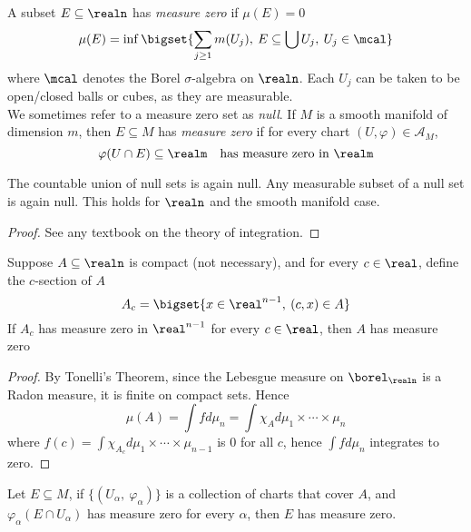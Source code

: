 \documentclass[../main-v2-manifolds.tex]{subfiles}
\begin{document}
\begin{definition}\label{lee-measure-zero}
    A subset $E\subseteq\realn$ has \emph{measure zero} if $\mu(E)=0$
    \[
        \mu(E) = \inf\bigset{\sum_{j\geq 1} m(U_j),\: E\subseteq \bigcup U_j,\: U_j\in\mcal}
    \]
    where $\mcal$ denotes the Borel $\sigma$-algebra on $\realn$. Each $U_j$ can be taken to be open/closed balls or cubes, as they are measurable.\\

    We sometimes refer to a measure zero set as \emph{null}. If $M$ is a smooth manifold of dimension $m$, then $E\subseteq M$ has \emph{measure zero} if for every chart $(U,\varphi)\in\mathcal{A}_M$, 
    \[
        \varphi(U\cap E)\subseteq\realm\quad\text{has measure zero in }\realm
    \]
\end{definition}
\begin{wts}\label{lee-sards-subadditivity}
    The countable union of null sets is again null. Any measurable subset of a null set is again null. This holds for $\realn$ and the smooth manifold case.
\end{wts}
\begin{proof}
    See any textbook on the theory of integration.
\end{proof}
\begin{wts}\label{lee-theorem6.2}
    Suppose $A\subseteq\realn$ is compact (not necessary), and for every $c\in \real$, define the $c$-section of $A$
    \[
        A_c = \bigset{x\in\real^{n-1},\: (c,x)\in A}
    \]
    If $A_c$ has measure zero in $\real^{n-1}$ for every $c\in\real$, then $A$ has measure zero
\end{wts}
\begin{proof}
    By Tonelli's Theorem, since the Lebesgue measure on $\borel_\realn$ is a Radon measure, it is finite on compact sets. Hence
    \[
        \mu(A)=\int fd\mu_n = \int \chi_{A}d\mu_1\times\cdots\times\mu_n
    \]
    where $f(c) = \int \chi_{A_c}d\mu_1\times\cdots\times\mu_{n-1}$ is $0$ for all $c$, hence $\int fd\mu_n$ integrates to zero.
\end{proof}
\begin{wts}\label{lee-theorem6.6}
    Let $E\subseteq M$, if $\{(U_\alpha,\: \varphi_\alpha)\}$ is a collection of charts that cover $A$, and $\varphi_\alpha(E\cap U_\alpha)$ has measure zero for every $\alpha$, then $E$ has measure zero.
\end{wts}
\end{document}
